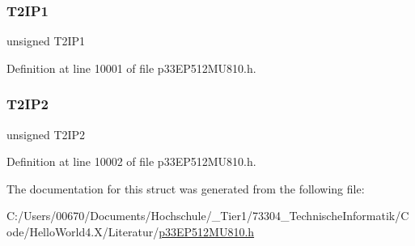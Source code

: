 \subsubsection{\texorpdfstring{T2\+I\+P1}{T2IP1}}
{\footnotesize\ttfamily unsigned T2\+I\+P1}



Definition at line 10001 of file p33\+E\+P512\+M\+U810.\+h.

\mbox{\label{structtag_i_p_c1_b_i_t_s_ae2d6448a9aed641feb94200b6b60b6f9}} 
\subsubsection{\texorpdfstring{T2\+I\+P2}{T2IP2}}
{\footnotesize\ttfamily unsigned T2\+I\+P2}



Definition at line 10002 of file p33\+E\+P512\+M\+U810.\+h.



The documentation for this struct was generated from the following file\+:\begin{DoxyCompactItemize}
\item 
C\+:/\+Users/00670/\+Documents/\+Hochschule/\+\_\+\+Tier1/73304\+\_\+\+Technische\+Informatik/\+Code/\+Hello\+World4.\+X/\+Literatur/\hyperlink{p33_e_p512_m_u810_8h}{p33\+E\+P512\+M\+U810.\+h}\end{DoxyCompactItemize}
